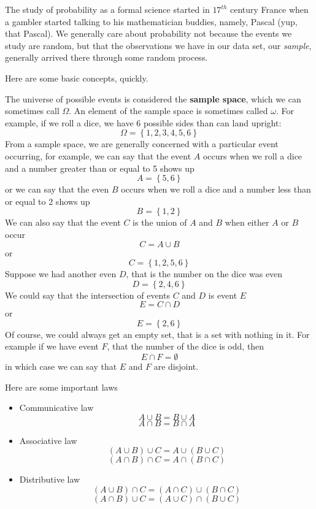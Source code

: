 The study of probability as a formal science started in $17^{th}$ century France when a gambler started talking to his mathematician buddies, namely, Pascal (yup, that Pascal). We generally care about probability not because the events we study are random, but that the observations we have in our data set, our {\it sample}, generally arrived there through some random process.

Here are some basic concepts, quickly.

The universe of possible events is considered the {\bf sample space}, which we can sometimes call $\Omega$. An element of the sample space is sometimes called $\omega$. For example, if we roll a dice, we have 6 possible sides than can land upright:
\[
\Omega = \left\{1,2,3,4,5,6\right\}
\]
From a sample space, we are generally concerned with a particular event occurring, for example, we can say that the event $A$ occurs when we roll a dice and a number greater than or equal to 5 shows up
\[
A = \left\{5,6\right\}
\]
or we can say that the even $B$ occurs when we roll a dice and a number less than or equal to 2 shows up
\[
B = \left\{1,2\right\}
\]
We can also say that the event $C$ is the union of $A$ and $B$ when either $A$ or $B$ occur
\[
C = A \cup B
\]
or
\[
C = \left\{1,2,5,6\right\}
\]
Suppose we had another even $D$, that is the number on the dice was even
\[
D = \left\{2,4,6\right\}
\]
We could say that the intersection of events $C$ and $D$ is event $E$
\[
E = C \cap D
\]
or
\[
E = \left\{2,6\right\}
\]
Of course, we could always get an empty set, that is a set with nothing in it. For example if we have event $F$, that the number of the dice is odd, then
\[
E \cap F = \emptyset
\]
in which case we can say that $E$ and $F$ are disjoint.

Here are some important laws
\begin{itemize}
\item{Communicative law}
\begin{equation}
A \cup B = B \cup A
\end{equation}
\begin{equation}
A \cap B = B \cap A
\end{equation}
\item{Associative law}
\begin{equation}
\left(A\cup B\right)\cup C = A \cup \left(B \cup C\right)
\end{equation}
\begin{equation}
\left(A\cap B\right)\cap C = A \cap \left(B \cap C\right)
\end{equation}
\item{Distributive law}
\begin{equation}
\left(A \cup B\right)\cap C = \left(A \cap C\right)\cup\left(B \cap C\right)
\end{equation}
\begin{equation}
\left(A \cap B\right)\cup C = \left(A \cup C\right)\cap\left(B \cup C\right)
\end{equation}
\end{itemize}

